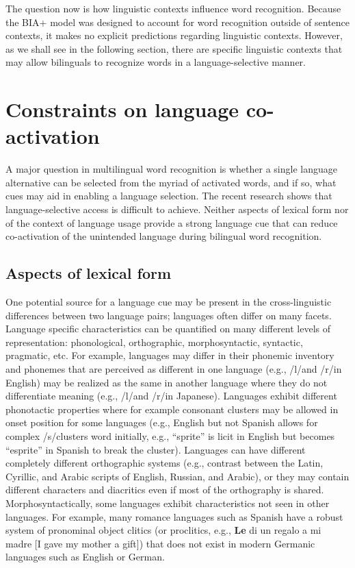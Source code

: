 The question now is how linguistic contexts influence word recognition. Because the BIA+ model was designed to account for word recognition outside of sentence contexts, it makes no explicit predictions regarding linguistic contexts. However, as we shall see in the following section, there are specific linguistic contexts that may allow bilinguals to recognize words in a language-selective manner.

\section{Constraints on language co-activation}
\label{constraintsonlanguageco-activation}

A major question in multilingual word recognition is whether a single language alternative can be selected from the myriad of activated words, and if so, what cues may aid in enabling a language selection. The recent research shows that language-selective access is difficult to achieve. Neither aspects of lexical form nor of the context of language usage provide a strong language cue that can reduce co-activation of the unintended language during bilingual word recognition. 

\subsection{Aspects of lexical form}
\label{aspectsoflexicalform}

One potential source for a language cue may be present in the cross-linguistic differences between two language pairs; languages often differ on many facets. Language specific characteristics can be quantified on many different levels of representation: phonological, orthographic, morphosyntactic, syntactic, pragmatic, etc. For example, languages may differ in their phonemic inventory and phonemes that are perceived as different in one language (e.g., \slash l\slash  and \slash r\slash  in English) may be realized as the same in another language where they do not differentiate meaning (e.g., \slash l\slash  and \slash r\slash  in Japanese). Languages exhibit different phonotactic properties where for example consonant clusters may be allowed in onset position for some languages (e.g., English but not Spanish allows for complex \slash s\slash  clusters word initially, e.g., ``sprite'' is licit in English but becomes ``esprite'' in Spanish to break the cluster). Languages can have different completely different orthographic systems (e.g., contrast between the Latin, Cyrillic, and Arabic scripts of English, Russian, and Arabic), or they may contain different characters and diacritics even if most of the orthography is shared. Morphosyntactically, some languages exhibit characteristics not seen in other languages. For example, many romance languages such as Spanish have a robust system of pronominal object clitics (or proclitics, e.g., \textbf{Le} di un regalo a mi madre [I gave my mother a gift]) that does not exist in modern Germanic languages such as English or German. 

